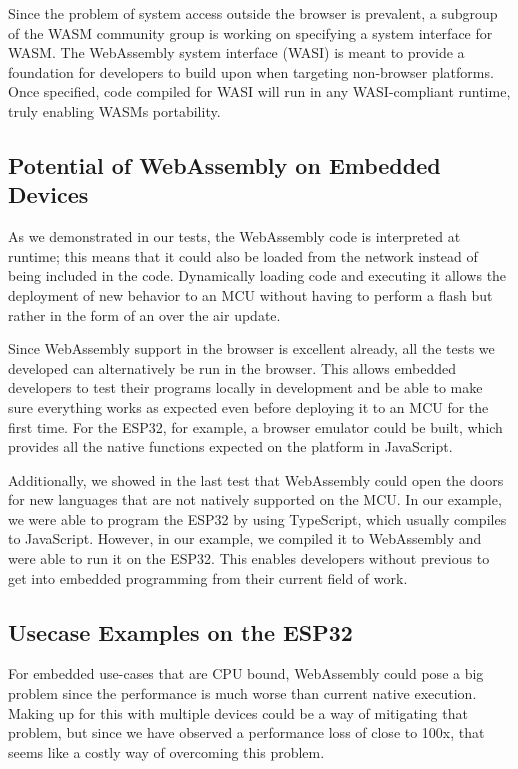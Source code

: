 Since the problem of system access outside the browser is prevalent, a subgroup of the WASM community group is working on specifying a system interface for WASM\autocite{clark_standardizing_2019}. The WebAssembly system interface (WASI) is meant to provide a foundation for developers to build upon when targeting non-browser platforms. Once specified, code compiled for WASI will run in any WASI-compliant runtime, truly enabling WASMs portability.

\subsection{Potential of WebAssembly on Embedded Devices}

As we demonstrated in our tests, the WebAssembly code is interpreted at runtime; this means that it could also be loaded from the network instead of being included in the code. Dynamically loading code and executing it allows the deployment of new behavior to an MCU without having to perform a flash but rather in the form of an over the air update.

Since WebAssembly support in the browser is excellent already, all the tests we developed can alternatively be run in the browser. This allows embedded developers to test their programs locally in development and be able to make sure everything works as expected even before deploying it to an MCU for the first time. For the ESP32, for example, a browser emulator could be built, which provides all the native functions expected on the platform in JavaScript.

Additionally, we showed in the last test that WebAssembly could open the doors for new languages that are not natively supported on the MCU. In our example, we were able to program the ESP32 by using TypeScript, which usually compiles to JavaScript. However, in our example, we compiled it to WebAssembly and were able to run it on the ESP32. This enables developers without previous to get into embedded programming from their current field of work.

\subsection{Usecase Examples on the ESP32}

For embedded use-cases that are CPU bound, WebAssembly could pose a big problem since the performance is much worse than current native execution. Making up for this with multiple devices could be a way of mitigating that problem, but since we have observed a performance loss of close to 100x, that seems like a costly way of overcoming this problem.

